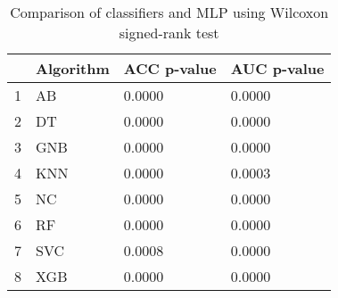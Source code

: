 \begin{table}
\footnotesize
\caption{Comparison of classifiers and MLP using Wilcoxon signed-rank test}
\label{tab:wilcoxon comparison}
\begin{tabular}{llll}
\hline
 & Algorithm & ACC p-value & AUC p-value \\
\hline
1 & AB & 0.0000 & 0.0000 \\
2 & DT & 0.0000 & 0.0000 \\
3 & GNB & 0.0000 & 0.0000 \\
4 & KNN & 0.0000 & 0.0003 \\
5 & NC & 0.0000 & 0.0000 \\
6 & RF & 0.0000 & 0.0000 \\
7 & SVC & 0.0008 & 0.0000 \\
8 & XGB & 0.0000 & 0.0000 \\
\hline
\end{tabular}
\end{table}
